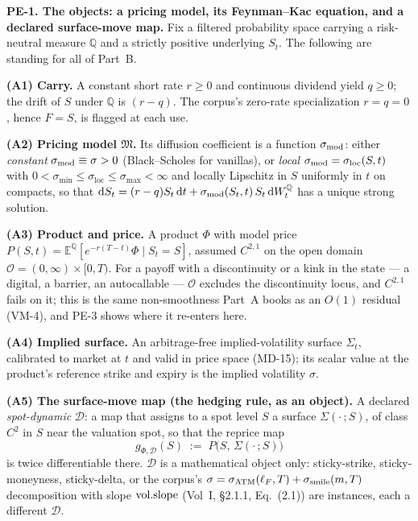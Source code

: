 \textbf{PE-1. The objects: a pricing model, its Feynman--Kac
equation, and a declared surface-move map.} Fix a filtered probability space
carrying a risk-neutral measure $\mathbb{Q}$ and a strictly positive
underlying $S_t$. The following are standing for all of Part~B.

\textbf{(A1) Carry.} A constant short rate $r \ge 0$ and continuous dividend
yield $q \ge 0$; the drift of $S$ under $\mathbb{Q}$ is $(r-q)$. The corpus's
zero-rate specialization $r=q=0$, hence $F=S$, is flagged at each use.

\textbf{(A2) Pricing model $\mathfrak{M}$.} Its diffusion coefficient is a
function $\sigma_{\mathrm{mod}}$: either \emph{constant} $\sigma_{\mathrm{mod}} \equiv \sigma > 0$
(Black--Scholes for vanillas), or \emph{local} $\sigma_{\mathrm{mod}} = \sigma_{\mathrm{loc}}(S,t)$
with $0 < \sigma_{\min} \le \sigma_{\mathrm{loc}} \le \sigma_{\max} < \infty$
and locally Lipschitz in $S$ uniformly in $t$ on compacts, so that
$\mathrm{d} S_t = (r-q)S_t\,\mathrm{d} t + \sigma_{\mathrm{mod}}(S_t,t)\,S_t\,\mathrm{d} W_t^{\mathbb Q}$ has a unique
strong solution.

\textbf{(A3) Product and price.} A product $\Phi$ with model price
$P(S,t) = \mathbb{E}^{\mathbb Q}\!\left[e^{-r(T-t)}\Phi \mid S_t = S\right]$,
assumed $C^{2,1}$ on the open domain
$\mathcal{O} = (0,\infty)\times[0,T)$. For a payoff with a discontinuity or a
kink in the state --- a digital, a barrier, an autocallable --- $\mathcal{O}$
excludes the discontinuity locus, and $C^{2,1}$ fails on it; this is the same
non-smoothness Part~A books as an $O(1)$ residual (VM-4), and PE-3 shows where
it re-enters here.

\textbf{(A4) Implied surface.} An arbitrage-free implied-volatility surface
$\Sigma_t$, calibrated to market at $t$ and valid in price space (MD-15); its
scalar value at the product's reference strike and expiry is the implied
volatility $\sigma$.

\textbf{(A5) The surface-move map (the hedging rule, as an object).} A declared
\emph{spot-dynamic} $\mathcal{D}$: a map that assigns to a spot level $S$ a
surface $\Sigma(\cdot\,;S)$, of class $C^2$ in $S$ near the valuation spot, so
that the reprice map
\begin{equation}\label{pe:reprice}
  g_{\Phi,\mathcal D}(S) \;:=\; P\bigl(S,\,\Sigma(\cdot\,;S)\bigr)
\end{equation}
is twice differentiable there. $\mathcal{D}$ is a mathematical object only:
sticky-strike, sticky-moneyness, sticky-delta, or the corpus's
$\sigma=\sigma_{\mathrm{ATM}}(\ell_F,T)+\sigma_{\mathrm{smile}}(m,T)$ decomposition with slope $\mathrm{vol.slope}$
(Vol~I, \S2.1.1, Eq.~(2.1)) are instances, each a different $\mathcal{D}$.

